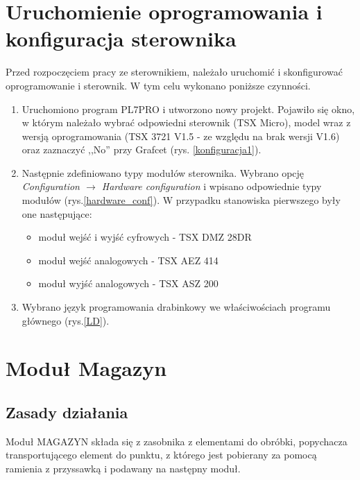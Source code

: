 \documentclass[12pt]{article}
\begin{document}
\section{Uruchomienie oprogramowania i konfiguracja sterownika}
Przed rozpoczęciem pracy ze sterownikiem, należało uruchomić i skonfigurować oprogramowanie
i sterownik. W tym celu wykonano poniższe czynności.
\begin{enumerate}
    \item Uruchomiono program PL7PRO i utworzono nowy projekt. Pojawiło się okno, w którym należało wybrać odpowiedni sterownik (TSX Micro), model wraz z wersją oprogramowania (TSX
    3721 V1.5 - ze względu na brak wersji V1.6) oraz zaznaczyć ,,No'' przy Grafcet (rys. \ref{konfiguracja1}).
    \item Następnie zdefiniowano typy modułów sterownika. Wybrano opcję \textit{Configuration $ \rightarrow $ Hardware configuration} i wpisano odpowiednie typy modułów (rys.\ref{hardware_conf}). W przypadku stanowiska pierwszego były one następujące: 
    \begin{itemize}
        \item moduł wejść i wyjść cyfrowych - TSX DMZ 28DR
        \item moduł wejść analogowych - TSX AEZ 414
        \item moduł wyjść analogowych - TSX ASZ 200
    \end{itemize}
    \item Wybrano język programowania drabinkowy we właściwościach programu głównego (rys.\ref{LD}).
\end{enumerate}


\section{Moduł Magazyn}
\subsection{Zasady działania}
Moduł MAGAZYN składa się z zasobnika z elementami do obróbki, popychacza transportującego element do punktu, z którego jest pobierany za pomocą ramienia z przyssawką i podawany na następny moduł. 
\end{document}
